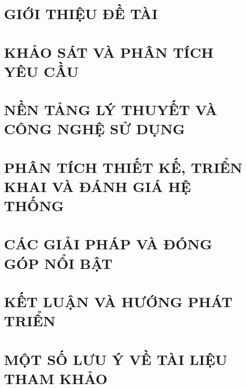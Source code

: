 \documentclass[a4paper,13pt,3p,twoside]{report}
\renewcommand{\bibname}{Danh_sach_tai_lieu_tham_khao}
\theoremstyle{definition}
\begin{document}


\newpage
{}

\pagestyle{fancy}
\fancyhf{}
\fancyhead[RE, LO]{\leftmark}
\fancyfoot[RE, LO]{\thepage}

\chapter{GIỚI THIỆU ĐỀ TÀI}
\label{chapter:Introduction}

\newpage
\chapter{KHẢO SÁT VÀ PHÂN TÍCH YÊU CẦU}
\label{chapter:Related_works}



\newpage
\chapter{NỀN TẢNG LÝ THUYẾT VÀ CÔNG NGHỆ SỬ DỤNG}
\label{chapter:Methodology}


\newpage
\chapter{PHÂN TÍCH THIẾT KẾ, TRIỂN KHAI VÀ ĐÁNH GIÁ HỆ THỐNG}
\label{chapter:Experiment}


\newpage
\chapter{CÁC GIẢI PHÁP VÀ ĐÓNG GÓP NỔI BẬT}
\label{chapter:SolutionAndContribution}

\newpage
\chapter{KẾT LUẬN VÀ HƯỚNG PHÁT TRIỂN}
\label{chapter:conclusion}


\newpage
\chapter*{MỘT SỐ LƯU Ý VỀ TÀI LIỆU THAM KHẢO}
\label{chapter:reference}



\newpage
\renewcommand\bibname{TÀI LIỆU THAM KHẢO}
\printbibliography
{}
\end{document}
